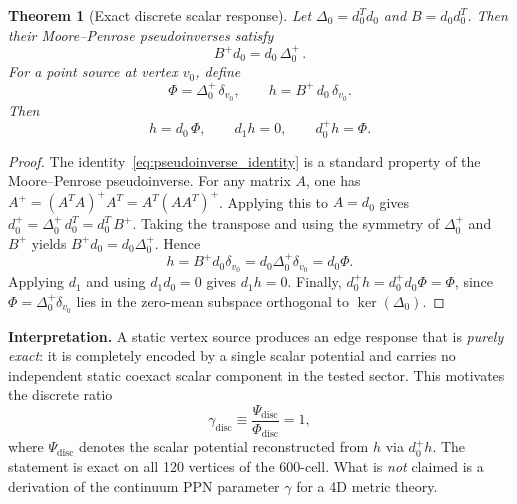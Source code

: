 \documentclass[12pt,a4paper]{article}
\newtheorem{theorem}{Theorem}
\theoremstyle{definition}
\begin{document}
\begin{theorem}[Exact discrete scalar response]
\label{thm:discrete_scalar_response}
Let $\Delta_0 = d_0^T d_0$ and $B = d_0 d_0^T$.  Then their Moore--Penrose
pseudoinverses satisfy
\begin{equation}
\boxed{B^+ d_0 = d_0\,\Delta_0^+}\,.
\label{eq:pseudoinverse_identity}
\end{equation}
For a point source at vertex $v_0$, define
\begin{equation}
\Phi = \Delta_0^+\,\delta_{v_0},
\qquad
h = B^+\,d_0\,\delta_{v_0}.
\end{equation}
Then
\begin{equation}
h = d_0\,\Phi,
\qquad
d_1 h = 0,
\qquad
d_0^+ h = \Phi.
\label{eq:discrete_scalar_response}
\end{equation}
\end{theorem}

\begin{proof}
The identity~\eqref{eq:pseudoinverse_identity} is a standard property of the
Moore--Penrose pseudoinverse.  For any matrix $A$, one has
$A^+ = (A^T\!A)^+ A^T = A^T (AA^T)^+$.  Applying this to $A = d_0$ gives
$d_0^+ = \Delta_0^+\,d_0^T = d_0^T\,B^+$.  Taking the transpose and using the
symmetry of $\Delta_0^+$ and $B^+$ yields
$B^+ d_0 = d_0 \Delta_0^+$.
Hence
\begin{equation}
h = B^+ d_0 \delta_{v_0} = d_0 \Delta_0^+ \delta_{v_0} = d_0 \Phi.
\end{equation}
Applying $d_1$ and using $d_1 d_0 = 0$ gives $d_1 h = 0$.  Finally,
$d_0^+ h = d_0^+ d_0 \Phi = \Phi$, since $\Phi = \Delta_0^+ \delta_{v_0}$
lies in the zero-mean subspace orthogonal to $\ker(\Delta_0)$.
\end{proof}

\textbf{Interpretation.}  A static vertex source produces an edge response that
is \emph{purely exact}: it is completely encoded by a single scalar potential
and carries no independent static coexact scalar component in the tested
sector.  This motivates the discrete ratio
\begin{equation}
\gamma_{\mathrm{disc}} \equiv \frac{\Psi_{\mathrm{disc}}}{\Phi_{\mathrm{disc}}}
= 1,
\end{equation}
where $\Psi_{\mathrm{disc}}$ denotes the scalar potential reconstructed from
$h$ via $d_0^+ h$.  The statement is exact on all 120 vertices of the 600-cell.
What is \emph{not} claimed is a derivation of the continuum PPN parameter
$\gamma$ for a 4D metric theory.
\end{document}
